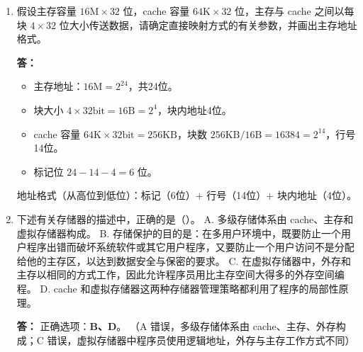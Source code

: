 \documentclass{article}
\begin{document}
\begin{enumerate}[label=\arabic*.]
    \textbf{答：}
    \begin{itemize}
        \item 主存地址：$1\text{MB}=2^{20}$，共20位。
        \item 块大小 $16\text{B}=2^4$，块内地址4位。
        \item cache 容量 $64\text{KB}$，块数 $64\text{KB}/16\text{B}=4096=2^{12}$，行号12位。
        \item 标记位 $20-12-4=4$ 位。
    \end{itemize}
    同一行的地址，行号和块内地址相同，标记不同。例如：
    \begin{itemize}
        \item 地址1：标记 $0000$，行号 $000000000000$，块内 $0000$ → 0000 000000000000 0000
        \item 地址2：标记 $0001$，行号 $000000000000$，块内 $0000$ → 0001 000000000000 0000
    \end{itemize}

    \item 假设主存容量 $16\text{M}\times32$ 位，cache 容量 $64\text{K}\times32$ 位，主存与 cache 之间以每块 $4\times32$ 位大小传送数据，请确定直接映射方式的有关参数，并画出主存地址格式。
    
    \textbf{答：}
    \begin{itemize}
        \item 主存地址：$16\text{M}=2^{24}$，共24位。
        \item 块大小 $4\times32\text{bit}=16\text{B}=2^4$，块内地址4位。
        \item cache 容量 $64\text{K}\times32\text{bit}=256\text{KB}$，块数 $256\text{KB}/16\text{B}=16384=2^{14}$，行号14位。
        \item 标记位 $24-14-4=6$ 位。
    \end{itemize}
    地址格式（从高位到低位）：标记（6位）+ 行号（14位）+ 块内地址（4位）。

    \item 下述有关存储器的描述中，正确的是（）。
    A. 多级存储体系由 cache、主存和虚拟存储器构成。
    B. 存储保护的目的是：在多用户环境中，既要防止一个用户程序出错而破坏系统软件或其它用户程序，又要防止一个用户访问不是分配给他的主存区，以达到数据安全与保密的要求。
    C. 在虚拟存储器中，外存和主存以相同的方式工作，因此允许程序员用比主存空间大得多的外存空间编程。
    D. cache 和虚拟存储器这两种存储器管理策略都利用了程序的局部性原理。
    
    \textbf{答：}
    正确选项：\textbf{B、D}。
    （A 错误，多级存储体系由 cache、主存、外存构成；C 错误，虚拟存储器中程序员使用逻辑地址，外存与主存工作方式不同）


\end{enumerate}
\end{document}
